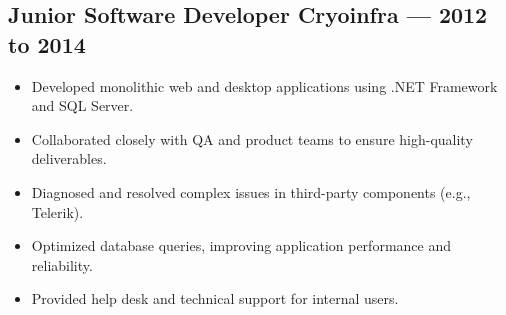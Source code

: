 \subsection*{Junior Software Developer \hfill Cryoinfra — 2012 to 2014}
\begin{itemize}[leftmargin=12pt]
    \item Developed monolithic web and desktop applications using .NET Framework and SQL Server.
    \item Collaborated closely with QA and product teams to ensure high-quality deliverables.
    \item Diagnosed and resolved complex issues in third-party components (e.g., Telerik).
    \item Optimized database queries, improving application performance and reliability.
    \item Provided help desk and technical support for internal users.
\end{itemize}
